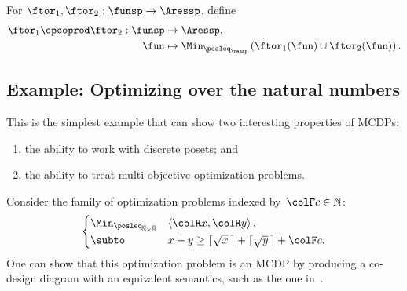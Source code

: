 \begin{defn}
\label{def:opcoprod}For $\ftor_{1},\ftor_{2}:\funsp\rightarrow\Aressp$,
define
\begin{align*}
\ftor_{1}\opcoprod\ftor_{2}:\funsp & \rightarrow\Aressp,\\
\fun & \mapsto\Min_{\posleq_{\ressp}}\left(\ftor_{1}(\fun)\cup\ftor_{2}(\fun)\right).
\end{align*}
\end{defn}


\subsection{Example: Optimizing over the natural numbers}

This is the simplest example that can show two interesting properties
of MCDPs: 
\begin{enumerate}
\item the ability to work with discrete posets; and 
\item the ability to treat multi-objective optimization problems.
\end{enumerate}
Consider the family of optimization problems indexed by~${\colF c}\in\mathbb{N}$:
\begin{equation}
\begin{cases}
\Min_{\posleq_{\overline{\mathbb{N}}\times\overline{\mathbb{N}}}} & \left\langle {\colR x},{\colR y}\right\rangle ,\\
\subto & x+y\geq\lceil\sqrt{x}\,\rceil+\lceil\sqrt{y}\,\rceil+{\colF c}.
\end{cases}\label{eq:example-1}
\end{equation}
One can show that this optimization problem is an MCDP by producing
a co-design diagram with an equivalent semantics, such as the one
in~. 

